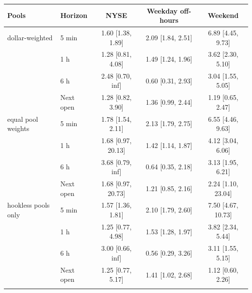\begin{tabular}{llccc}
\toprule
Pools & Horizon & NYSE & Weekday off-hours & Weekend \\
\midrule
dollar-weighted & 5 min & 1.60 [1.38, 1.89] & 2.09 [1.84, 2.51] & 6.89 [4.45, 9.73] \\
 & 1 h & 1.28 [0.81, 4.08] & 1.49 [1.24, 1.96] & 3.62 [2.30, 5.10] \\
 & 6 h & 2.48 [0.70, inf] & 0.60 [0.31, 2.93] & 3.04 [1.55, 5.05] \\
 & Next open & 1.28 [0.82, 3.90] & 1.36 [0.99, 2.44] & 1.19 [0.65, 2.47] \\
\addlinespace[2pt]
equal pool weights & 5 min & 1.78 [1.54, 2.11] & 2.13 [1.79, 2.75] & 6.55 [4.46, 9.63] \\
 & 1 h & 1.68 [0.97, 20.13] & 1.42 [1.14, 1.87] & 4.12 [3.04, 6.06] \\
 & 6 h & 3.68 [0.79, inf] & 0.64 [0.35, 2.18] & 3.13 [1.95, 6.21] \\
 & Next open & 1.68 [0.97, 20.73] & 1.21 [0.85, 2.16] & 2.24 [1.10, 23.04] \\
\addlinespace[2pt]
hookless pools only & 5 min & 1.57 [1.36, 1.81] & 2.10 [1.79, 2.60] & 7.50 [4.67, 10.73] \\
 & 1 h & 1.25 [0.77, 4.98] & 1.53 [1.28, 1.97] & 3.82 [2.34, 5.44] \\
 & 6 h & 3.00 [0.66, inf] & 0.56 [0.29, 3.26] & 3.11 [1.55, 5.15] \\
 & Next open & 1.25 [0.77, 5.17] & 1.41 [1.02, 2.68] & 1.12 [0.60, 2.26] \\
\addlinespace[2pt]
\bottomrule
\end{tabular}
